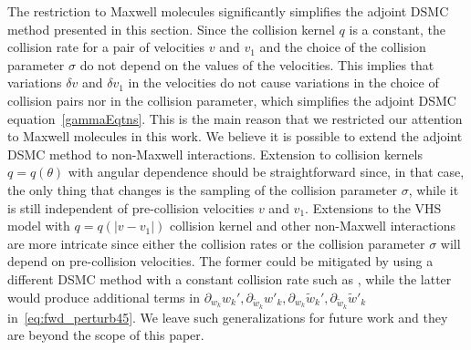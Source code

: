 \documentclass[times,final,nopreprintline]{elsarticle}
\begin{document}

The restriction to Maxwell molecules significantly simplifies the adjoint DSMC method presented in this section. Since the collision kernel $q$ is a constant, the collision rate for a pair of velocities $v$ and $v_1$ and the choice of the collision parameter $\sigma$ do not depend on the values of the velocities. This implies that variations  $\delta v$ and  $\delta v_1$ in the velocities do not cause variations in the choice of collision pairs nor in the collision parameter, which simplifies the adjoint DSMC equation~\eqref{gammaEqtns}. This is the main reason that we restricted our attention to Maxwell molecules in this work. 
We believe it is possible to extend the adjoint DSMC method to non-Maxwell interactions. Extension to collision kernels $q=q(\theta)$ with angular dependence should be straightforward since, in that case, the only thing that changes is the sampling of the collision parameter $\sigma$, while it is still independent of pre-collision velocities $v$ and $v_1$. Extensions to the VHS model with $q=q(|v-v_1|)$ collision kernel and other non-Maxwell interactions are more intricate since either the collision rates or the collision parameter $\sigma$ will depend on pre-collision velocities. The former could be mitigated by using a different DSMC method with a constant collision rate such as \cite{BobylevNanbu2000}, while the latter would produce additional terms in $\partial_{w_k}w_k', \partial_{\tilde w_k}w'_k, \partial_{w_k}\tilde w_k', \partial_{\tilde w_k}\tilde w'_k$ in~\eqref{eq:fwd_perturb45}. We leave such generalizations for future work and they are beyond the scope of this paper.
\end{document}
